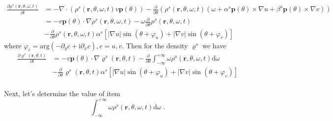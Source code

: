 \documentclass{article}
\begin{document}
\begin{enumerate}
    \begin{equation}
        \begin{aligned}
            \frac{\partial \rho ^s\left( \mathbf{r},\theta ,\omega ,t \right)}{\partial t}&=-\nabla \cdot \left( \rho ^s\left( \mathbf{r},\theta ,\omega ,t \right) v\mathbf{p}\left( \theta \right) \right) -\frac{\partial}{\partial \theta}\left( \rho ^s\left( \mathbf{r},\theta ,\omega ,t \right) \left( \omega +\alpha ^s\mathbf{p}\left( \theta \right) \times \nabla u+\beta ^s\mathbf{p}\left( \theta \right) \times \nabla v \right) \right)\\
            &=-v\mathbf{p}\left( \theta \right) \cdot \nabla \rho ^s\left( \mathbf{r},\theta ,\omega ,t \right) -\omega \frac{\partial}{\partial \theta}\rho ^s\left( \mathbf{r},\theta ,\omega ,t \right)\\
            &-\frac{\partial}{\partial \theta}\rho ^s\left( \mathbf{r},\theta ,\omega ,t \right) \alpha ^s\left[ \left| \nabla u \right|\sin \left( \theta +\varphi _u \right) +\left| \nabla v \right|\sin \left( \theta +\varphi _v \right) \right]
        \end{aligned}
    \end{equation}
    where $\varphi _c=\mathrm{arg}\left( -\partial _yc+\mathrm{i}\partial _xc \right) , c=u, v$. Then for the density $\varrho ^s$ we have
    \begin{equation}
        \label{eq:coarseDensityChemotactic}
        \begin{aligned}
            \frac{\partial \varrho ^s\left( \mathbf{r},\theta ,t \right)}{\partial t}&=-v\mathbf{p}\left( \theta \right) \cdot \nabla \varrho ^s\left( \mathbf{r},\theta ,t \right) -\frac{\partial}{\partial \theta}\int_{-\infty}^{+\infty}{\omega \rho ^s\left( \mathbf{r},\theta ,\omega ,t \right) \mathrm{d}\omega}\\
            &-\frac{\partial}{\partial \theta}\varrho ^s\left( \mathbf{r},\theta ,t \right) \alpha ^s\left[ \left| \nabla u \right|\sin \left( \theta +\varphi _u \right) +\left| \nabla v \right|\sin \left( \theta +\varphi _v \right) \right]\\
        \end{aligned}
    \end{equation}
\end{enumerate}
Next, let's determine the value of item
\begin{equation}
    \int_{-\infty}^{+\infty}{\omega \rho ^s\left( \mathbf{r},\theta ,\omega ,t \right) \text{d}\omega}\;.
\end{equation}
\end{document}

